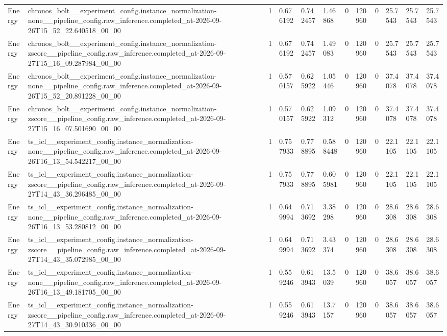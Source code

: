 \begin{tabular}{llllllllllll}
Energy & chronos\_bolt\_\_experiment\_config.instance\_normalization-none\_\_pipeline\_config.raw\_inference.completed\_at-2026-09-26T15\_52\_22.640518\_00\_00 & 1 & 0.676192 & 0.742457 & 1.46868 & 0 & 120960 & 0 & 25.7543 & 25.7543 & 25.7543 \\
Energy & chronos\_bolt\_\_experiment\_config.instance\_normalization-zscore\_\_pipeline\_config.raw\_inference.completed\_at-2026-09-27T15\_16\_09.287984\_00\_00 & 1 & 0.676192 & 0.742457 & 1.49083 & 0 & 120960 & 0 & 25.7543 & 25.7543 & 25.7543 \\
Energy & chronos\_bolt\_\_experiment\_config.instance\_normalization-none\_\_pipeline\_config.raw\_inference.completed\_at-2026-09-26T15\_52\_20.891228\_00\_00 & 1 & 0.570157 & 0.625922 & 1.05446 & 0 & 120960 & 0 & 37.4078 & 37.4078 & 37.4078 \\
Energy & chronos\_bolt\_\_experiment\_config.instance\_normalization-zscore\_\_pipeline\_config.raw\_inference.completed\_at-2026-09-27T15\_16\_07.501690\_00\_00 & 1 & 0.570157 & 0.625922 & 1.09312 & 0 & 120960 & 0 & 37.4078 & 37.4078 & 37.4078 \\
Energy & ts\_icl\_\_experiment\_config.instance\_normalization-none\_\_pipeline\_config.raw\_inference.completed\_at-2026-09-26T16\_13\_54.542217\_00\_00 & 1 & 0.757933 & 0.778895 & 0.588448 & 0 & 120960 & 0 & 22.1105 & 22.1105 & 22.1105 \\
Energy & ts\_icl\_\_experiment\_config.instance\_normalization-zscore\_\_pipeline\_config.raw\_inference.completed\_at-2026-09-27T14\_43\_36.296485\_00\_00 & 1 & 0.757933 & 0.778895 & 0.605981 & 0 & 120960 & 0 & 22.1105 & 22.1105 & 22.1105 \\
Energy & ts\_icl\_\_experiment\_config.instance\_normalization-none\_\_pipeline\_config.raw\_inference.completed\_at-2026-09-26T16\_13\_53.280812\_00\_00 & 1 & 0.649994 & 0.713692 & 3.38298 & 0 & 120960 & 0 & 28.6308 & 28.6308 & 28.6308 \\
Energy & ts\_icl\_\_experiment\_config.instance\_normalization-zscore\_\_pipeline\_config.raw\_inference.completed\_at-2026-09-27T14\_43\_35.072985\_00\_00 & 1 & 0.649994 & 0.713692 & 3.43374 & 0 & 120960 & 0 & 28.6308 & 28.6308 & 28.6308 \\
Energy & ts\_icl\_\_experiment\_config.instance\_normalization-none\_\_pipeline\_config.raw\_inference.completed\_at-2026-09-26T16\_13\_49.181705\_00\_00 & 1 & 0.559246 & 0.613943 & 13.5039 & 0 & 120960 & 0 & 38.6057 & 38.6057 & 38.6057 \\
Energy & ts\_icl\_\_experiment\_config.instance\_normalization-zscore\_\_pipeline\_config.raw\_inference.completed\_at-2026-09-27T14\_43\_30.910336\_00\_00 & 1 & 0.559246 & 0.613943 & 13.7157 & 0 & 120960 & 0 & 38.6057 & 38.6057 & 38.6057 \\

\end{tabular}
